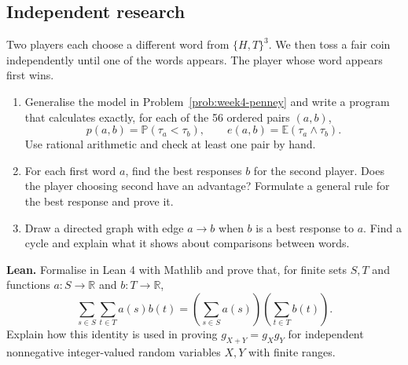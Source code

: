 \documentclass[11pt,a4paper]{article}
\newenvironment{enumeratea}{\begin{enumerate}[label=(\alph*),itemsep=0.28em,topsep=0.25em]}{\end{enumerate}}
\newcommand{\Pbb}{\mathbb P}
\newcommand{\Ebb}{\mathbb E}
\begin{document}
\subsection*{Independent research}
\begin{researchtask}
Two players each choose a different word from $\{H,T\}^3$. We then toss a fair
coin independently until one of the words appears. The player whose word appears first wins.
\begin{enumeratea}
  \item Generalise the model in Problem~\ref{prob:week4-penney} and write a program
  that calculates exactly, for each of the 56 ordered pairs $(a,b)$,
  \[ p(a,b)=\Pbb(\tau_a<\tau_b),\qquad e(a,b)=\Ebb(\tau_a\wedge\tau_b). \]
  Use rational arithmetic and check at least one pair by hand.
  \item For each first word $a$, find the best responses $b$ for the second player.
  Does the player choosing second have an advantage? Formulate a general rule
  for the best response and prove it.
  \item Draw a directed graph with edge $a\to b$ when $b$ is a best response to
  $a$. Find a cycle and explain what it shows about comparisons between words.
\end{enumeratea}
\end{researchtask}
\noindent\textbf{Lean.} Formalise in Lean 4 with Mathlib and prove that, for
finite sets $S,T$ and functions $a:S\to\mathbb R$ and $b:T\to\mathbb R$,
\[
\sum_{s\in S}\sum_{t\in T}a(s)b(t)
=\left(\sum_{s\in S}a(s)\right)\left(\sum_{t\in T}b(t)\right).
\]
Explain how this identity is used in proving $g_{X+Y}=g_Xg_Y$ for independent
nonnegative integer-valued random variables $X,Y$ with finite ranges.
\end{document}
